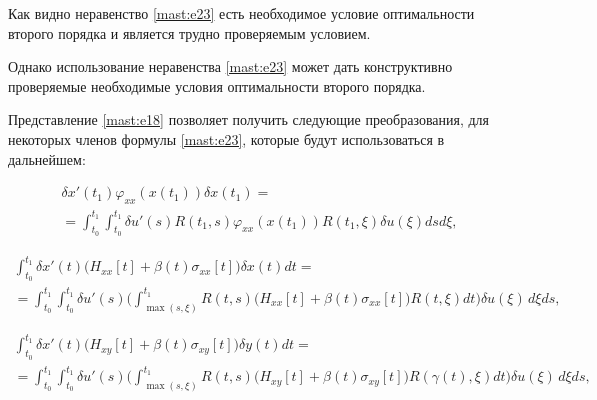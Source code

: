 \smallskip



Как видно неравенство \eqref{mast:e23} есть необходимое условие оптимальности второго порядка и является трудно проверяемым условием. 

Однако использование неравенства \eqref{mast:e23} может дать конструктивно проверяемые необходимые условия оптимальности второго порядка.

 

Представление \eqref{mast:e18} позволяет получить следующие преобразования, для некоторых членов формулы \eqref{mast:e23}, которые будут использоваться в дальнейшем:

\begin{multline}

  \label{mast:e25}

\delta x'(t_{1}) \varphi_{xx}(x(t_{1})) \delta x(t_{1})=

\\

 =\int^{t_{1}}_{t_{0}} \int^{t_{1}}_{t_{0}} \delta u'(s) R(t_{1},s) \varphi_{xx}(x(t_{1})) R(t_{1},\xi)\delta u(\xi) ds d\xi,

 \end{multline}

\begin{multline}

  \label{mast:e32}

\int^{t_{1}}_{t_{0}} \delta x'(t)\bigl( H_{xx}[t] +\beta (t) \sigma_{xx}[t]\bigr) \delta x(t)dt= \\

=\int^{t_{1}}_{t_{0}} \int^{t_{1}}_{t_{0}} \delta u'(s)\biggl( 

\int^{t_{1}}_{\max (s, \xi)} R(t,s) \bigl( H_{xx}[t] +\beta (t) \sigma_{xx}[t]\bigr) R(t,\xi) 

 dt  \biggr) \delta u(\xi)\, d\xi ds,

 \end{multline} 

\begin{multline}

  \label{mast:e32}

\int^{t_{1}}_{t_{0}} \delta x'(t)\bigl( H_{xy}[t] +\beta (t) \sigma_{xy}[t]\bigr) \delta y(t)dt= 

\\

=\int^{t_{1}}_{t_{0}} \int^{t_{1}}_{t_{0}} \delta u'(s)\biggl(

\int^{t_{1}}_{\max (s, \xi)} R(t,s) \bigl( H_{xy}[t] +\beta (t) \sigma_{xy}[t]\bigr) R(\gamma(t),\xi)  dt  \biggr) \delta u(\xi)\, d\xi ds,

 \end{multline} 

